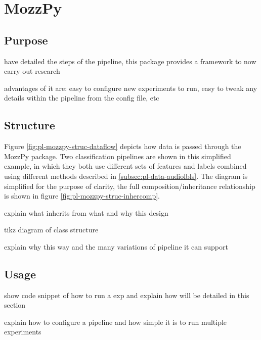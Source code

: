 \section{MozzPy}
\label{sec:pl-mozzpy}
    
    \subsection{Purpose}
    \label{subsec:pl-mozzpy-purp}
        \begin{sitemize}
            \item{have detailed the steps of the pipeline, this package provides a framework to now carry out research}
            \item{advantages of it are: easy to configure new experiments to run, easy to tweak any details within the pipeline from the config file, etc}
        \end{sitemize}
    
    \subsection{Structure}
    \label{subsec:pl-mozzpy-struc}
        
        
        Figure \ref{fig:pl-mozzpy-struc-dataflow} depicts how data is passed through the MozzPy package. Two classification pipelines are shown in this simplified example, in which they both use different sets of features and labels combined using different methods described in \ref{subsec:pl-data-audiolbls}. The diagram is simplified for the purpose of clarity, the full composition/inheritance relationship is shown in figure \ref{fig:pl-mozzpy-struc-inhercomp}.
        
        
        
        explain what inherits from what and why this design
    
        \begin{sitemize}
            \item{tikz diagram of class structure}
            \item{explain why this way and the many variations of pipeline it can support}
        \end{sitemize}
    
    \subsection{Usage}
    \label{subsec:pl-mozzpy-usage}
        \begin{sitemize}
            \item{show code snippet of how to run a exp and explain how will be detailed in this section}
            \item{explain how to configure a pipeline and how simple it is to run multiple experiments}
        \end{sitemize}
   
